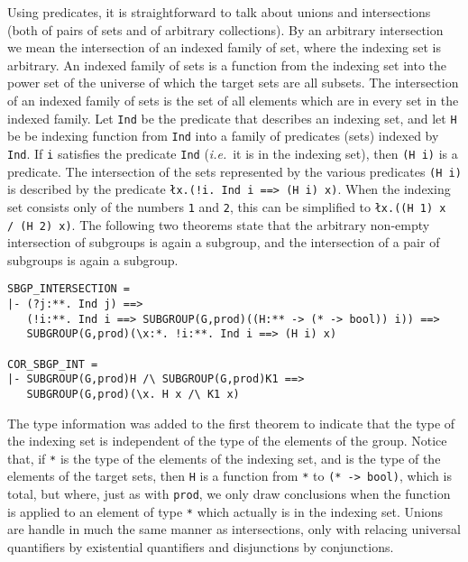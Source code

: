 Using predicates, it is straightforward to talk about unions and
intersections (both of pairs of sets and of arbitrary collections).
By an arbitrary intersection we mean the intersection of an indexed
family of set, where the indexing set is arbitrary.  An indexed family
of sets is a function from the indexing set into the power set of the
universe of which the target sets are all subsets.  The intersection
of an indexed family of sets is the set of all elements which are in
every set in the indexed family.  Let {\tt Ind} be the predicate that
describes an indexing set, and let {\tt H} be be indexing function
from {\tt Ind} into a family of predicates (sets) indexed by {\tt Ind}.
If {\tt i} satisfies the predicate {\tt Ind} ({\it i.e.}~it is in the
indexing set), then {\tt (H i)} is a predicate.  The intersection of
the sets represented by the various predicates {\tt (H i)} is
described by the predicate \mbox{\tt\l x.(!i. Ind i ==> (H i) x)}.
When the indexing set consists only of the numbers {\tt 1} and {\tt 2},
this can be simplified to \mbox{\tt\l x.((H 1) x /\ (H 2) x)}.
The following two theorems state that the arbitrary non-empty
intersection of subgroups is again a subgroup, and the intersection of
a pair of subgroups is again a subgroup.

\begin{verbatim}
SBGP_INTERSECTION =
|- (?j:**. Ind j) ==>
   (!i:**. Ind i ==> SUBGROUP(G,prod)((H:** -> (* -> bool)) i)) ==>
   SUBGROUP(G,prod)(\x:*. !i:**. Ind i ==> (H i) x)

COR_SBGP_INT =
|- SUBGROUP(G,prod)H /\ SUBGROUP(G,prod)K1 ==>
   SUBGROUP(G,prod)(\x. H x /\ K1 x)
\end{verbatim}

The type information was added to the first theorem to indicate that
the type of the indexing set is independent of the type of the
elements of the group.  Notice that, if {\tt **} is the type of the
elements of the indexing set, and {\tt *} is the type of the elements
of the target sets, then {\tt H} is a function from {\tt **} to
{\tt (* -> bool)}, which is total, but where, just as with {\tt prod},
we only draw conclusions when the function is applied to an element
of type {\tt **} which actually is in the indexing set.  Unions are
handle in much the same manner as intersections, only with relacing
universal quantifiers by existential quantifiers and disjunctions by
conjunctions.

